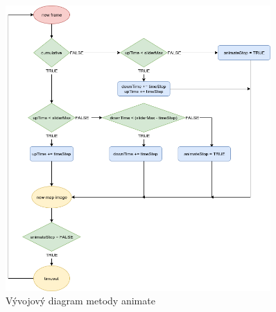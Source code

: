 \begin{figure}[h!]
\centering
\includegraphics[width=0.9\textwidth]{../img/animate.png}
\caption{Vývojový diagram metody animate}
\label{fig:animate-chart}
\end{figure}
